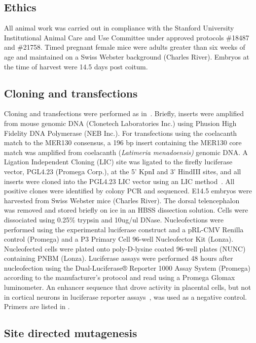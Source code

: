 \subsection{Ethics}\label{ethics}

All animal work was carried out in compliance with the Stanford
University Institutional Animal Care and Use Committee under approved
protocols \#18487 and \#21758. Timed pregnant female mice were adults
greater than six weeks of age and maintained on a Swiss Webster
background (Charles River). Embryos at the time of harvest were 14.5
days post coitum.

\subsection{Cloning and transfections}\label{cloning-and-transfections}

Cloning and transfections were performed as in~\citep{Wenger:2013ds}.
Briefly, inserts were amplified from mouse genomic DNA (Clonetech
Laboratories Inc.) using Phusion High Fidelity DNA Polymerase (NEB
Inc.). For transfections using the coelacanth match to the MER130
consensus, a 196 bp insert containing the MER130 core match was
amplified from coelacanth (\emph{Latimeria menadoensis)} genomic DNA. A
Ligation Independent Cloning (LIC) site was ligated to the firefly
luciferase vector, PGL4.23 (Promega Corp.), at the 5' KpnI and 3'
HindIII sites, and all inserts were cloned into the PGL4.23 LIC vector
using an LIC method~\citep{Du:2011cf}. All positive clones were
identified by colony PCR and sequenced. E14.5 embryos were harvested
from Swiss Webster mice (Charles River). The dorsal telencephalon was
removed and stored briefly on ice in an HBSS dissection solution. Cells
were dissociated using 0.25\% trypsin and 10ug/ul DNase. Nucleofections
were performed using the experimental luciferase construct and a pRL-CMV
Renilla control (Promega) and a P3 Primary Cell 96-well Nucleofector Kit
(Lonza). Nucleofected cells were plated onto poly-D-lysine coated
96-well plates (NUNC) containing PNBM (Lonza). Luciferase assays were
performed 48 hours after nucleofection using the Dual-Luciferase®
Reporter 1000 Assay System (Promega) according to the manufacturer's
protocol and read using a Promega Glomax luminometer. An enhancer
sequence that drove activity in placental cells, but not in cortical
neurons in luciferase reporter assays~\citep{Tuteja:2014cw}, was used as a
negative control. Primers are listed in .

\subsection{Site directed mutagenesis}\label{site-directed-mutagenesis}

